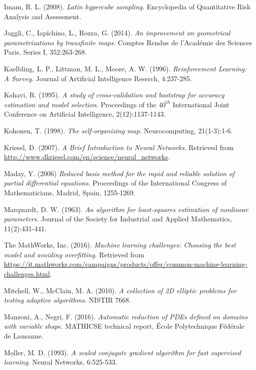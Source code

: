 \documentclass[12pt, a4paper, twoside, openright]{report}
\numberwithin{equation}{chapter}
\theoremstyle{theorem}
\theoremstyle{definition}
\theoremstyle{remark}
\theoremstyle{proposition}
\numberwithin{figure}{chapter}
\begin{document}
\begin{thebibliography}{50}
		Imam, R. L. (2008). \emph{Latin hypercube sampling}. Encyclopedia of Quantitative Risk Analysis and Assessment.
		
		Jaggli, C., Iapichino, L., Rozza, G. (2014). \emph{An improvement on geometrical parametrizations by transfinite maps}. Comptes Rendus de l'Acad\'emie des Sciences Paris, Series I, 352:263-268. 
				
		Kaelbling, L. P., Littman, M. L., Moore, A. W. (1996). \emph{Reinforcement Learning: A Survey}. Journal of Artificial Intelligence Reserch, 4:237-285.
		
		Kohavi, R. (1995). \emph{A study of cross-validation and bootstrap for accuracy estimation and model selection}. Proceedings of the $40^{th}$ International Joint Conference on Artificial Intelligence, 2(12):1137-1143.
		
		Kohonen, T. (1998). \emph{The self-organizing map}. Neurocomputing, 21(1-3):1-6.
		
		Kriesel, D. (2007). \emph{A Brief Introduction to Neural Networks}. Retrieved from \url{http://www.dkriesel.com/en/science/neural_networks}.
		
		Maday, Y. (2006) \emph{Reduced basis method for the rapid and reliable solution of partial differential equations}. Proceedings of the International Congress of Mathematicians, Madrid, Spain, 1255-1269.
		
		Marquardt, D. W. (1963). \emph{An algorithm for least-squares estimation of nonlinear parameters}. Journal of the Society for Industrial and Applied Mathematics, 11(2):431-441.
		
		The MathWorks, Inc. (2016). \emph{Machine learning challenges: Choosing the best model and avoiding overfitting}. Retrieved from \url{https://it.mathworks.com/campaigns/products/offer/common-machine-learning-challenges.html}.
		
		Mitchell, W., McClain, M. A. (2010). \emph{A collection of 2D elliptic problems for testing adaptive algorithms}. NISTIR 7668.
		
		Manzoni, A., Negri, F. (2016). \emph{Automatic reduction of PDEs defined on domains with variable shape}. MATHICSE technical report, \'Ecole Polytechnique F\'ed\'erale de Lausanne.
		
		M\b{o}ller, M. D. (1993). \emph{A scaled conjugate gradient algorithm for fast supervised learning}. Neural Networks, 6:525-533.
						

\end{thebibliography}
\end{document}
